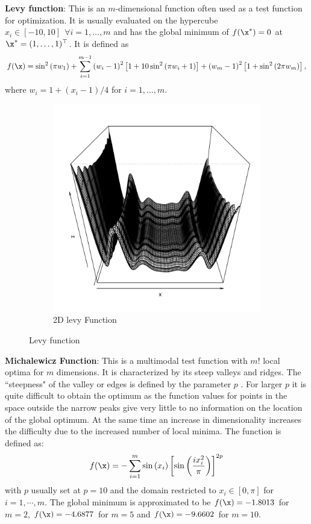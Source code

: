 \documentclass [PhD] {package/uclathes}
\begin{document}
\textbf{Levy function}: This is an $m$-dimensional function often used as a test function for optimization. It is usually evaluated on the hypercube $x_i\in[-10,10]~~\forall i=1,\ldots,m$ and has the global minimum of $f(\x^*)=0$ at $\x^*=(1,\ldots,1)^\top$. It is defined as
\[
f(\x)=\sin ^2\left(\pi w_1\right)+\sum_{i=1}^{m-1}\left(w_i-1\right)^2\left[1+10 \sin ^2\left(\pi w_i+1\right)\right]+\left(w_m-1\right)^2\left[1+\sin ^2\left(2 \pi w_m\right)\right],
\]
where $w_i=1+(x_i-1)/{4}$ for  $i=1, \ldots, m$.

\begin{figure}%
\centering
\begin{subfigure}[b]{0.4\textwidth}
\centering
\includegraphics[width=\textwidth]{chapters/EGO/pdfs/levy_10}
\caption{2D levy Function}
\end{subfigure}
\caption{Levy function}
\end{figure}

\textbf{Michalewicz Function}: This is a multimodal test function with $m!$ local optima for $m$ dimensions. It is characterized by its steep valleys and ridges. The ``steepness" of the valley or edges is defined by the parameter $p$ \parencite{molga2005test}. For larger $p$ it is quite difficult to obtain the optimum as the function values for points in the space outside the narrow peaks give very little to no information on the location of the global optimum. At the same time an increase in dimensionality increases the difficulty due to the increased number of local minima. The function is defined as:
\begin{equation*}
f(\x)=-\sum_{i=1}^m \sin \left(x_i\right)\left[\sin \left(\frac{i x_i^2}{\pi}\right)\right]^{2 p}
\end{equation*}
with $p$ usually set at $p = 10$ and the domain restricted to $x_i \in [0, \pi]$ for $i = 1,\cdots,m$. The global minimum is approximated to be $f(\x) = -1.8013$ for $m = 2$, $f(\x) = -4.6877$ for $m = 5$ and $f(\x) = -9.6602$ for $m = 10$.
\end{document}
